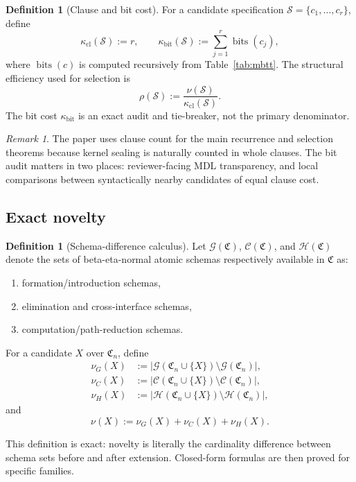 \documentclass{lmcs}
\theoremstyle{plain}
\theoremstyle{definition}
\newtheorem{defi}[thm]{Definition}
\theoremstyle{remark}
\newtheorem{rem}[thm]{Remark}
\newcommand{\Core}{\ensuremath{\mathfrak{C}}}
\newcommand{\bits}{\ensuremath{\operatorname{bits}}}
\newcommand{\LangG}{\ensuremath{\mathcal{G}}}
\newcommand{\LangC}{\ensuremath{\mathcal{C}}}
\newcommand{\LangH}{\ensuremath{\mathcal{H}}}
\begin{document}
\begin{defi}[Clause and bit cost]
For a candidate specification $\mathcal S=\{c_1,\dots,c_r\}$, define
\[
  \kappa_{\mathrm{cl}}(\mathcal S):=r,\qquad
  \kappa_{\mathrm{bit}}(\mathcal S):=\sum_{j=1}^r \bits(c_j),
\]
where $\bits(c)$ is computed recursively from Table~\ref{tab:mbtt}.
The structural efficiency used for selection is
\[
  \rho(\mathcal S):=\frac{\nu(\mathcal S)}{\kappa_{\mathrm{cl}}(\mathcal S)}.
\]
The bit cost $\kappa_{\mathrm{bit}}$ is an exact audit and tie-breaker, not the primary denominator.
\end{defi}

\begin{rem}
The paper uses clause count for the main recurrence and selection theorems because kernel sealing is naturally counted in whole clauses.
The bit audit matters in two places: reviewer-facing MDL transparency, and local comparisons between syntactically nearby candidates of equal clause cost.
\end{rem}

\subsection{Exact novelty}

\begin{defi}[Schema-difference calculus]
Let $\LangG(\Core)$, $\LangC(\Core)$, and $\LangH(\Core)$ denote the sets of beta-eta-normal atomic schemas respectively available in $\Core$ as:
\begin{enumerate}[label=(\arabic*),nosep]
  \item formation/introduction schemas,
  \item elimination and cross-interface schemas,
  \item computation/path-reduction schemas.
\end{enumerate}
For a candidate $X$ over $\Core_n$, define
\[
\begin{aligned}
\nu_G(X) &:= |\LangG(\Core_n\cup\{X\})\setminus \LangG(\Core_n)|,\\
\nu_C(X) &:= |\LangC(\Core_n\cup\{X\})\setminus \LangC(\Core_n)|,\\
\nu_H(X) &:= |\LangH(\Core_n\cup\{X\})\setminus \LangH(\Core_n)|,
\end{aligned}
\]
and
\[
  \nu(X):=\nu_G(X)+\nu_C(X)+\nu_H(X).
\]
\end{defi}

This definition is exact: novelty is literally the cardinality difference between schema sets before and after extension.
Closed-form formulas are then proved for specific families.
\end{document}
